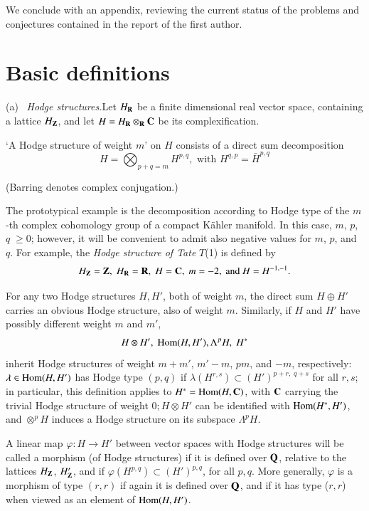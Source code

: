 We conclude with an appendix, reviewing the current status of the problems and conjectures contained in the report \cite{art4-key21} of the first author.

\section{Basic definitions}\label{art4-sec1}
(a)~ \textit{Hodge structures.}\pageoriginale Let $H_{\mathbf{R}}$ be a finite dimensional real vector space, containing a lattice $H_{\mathbf{Z}}$, and let $H=H_{\mathbf{R}} \otimes_{\mathbf{R}} \mathbf{C}$ be its complexification.

\begin{definition}\label{art4-def1.1}
`A Hodge structure of weight $m$' on $H$ consists of a direct sum decomposition
$$
H = \bigotimes_{p+q=m} H^{p,q}, \text{ with } H^{q,p} = \bar{H}^{p,q} 
$$
\end{definition}

(Barring denotes complex conjugation.)

\begin{remark*}
The prototypical example is the decomposition according to Hodge type of the $m$-th complex cohomology group of a compact K\"ahler manifold. In this case, $m$, $p$, $q \;\geqslant 0$; however, it will be convenient to admit also negative values for $m$, $p$, and $q$. For example, the \textit{Hodge structure of Tate} $T$(1) is defined by
$$
H_{\mathbf{Z}} =\mathbf{Z}, \; H_{\mathbf{R}} = \mathbf{R}, \; H = \mathbf{C}, \; m= -2, \text{ and } H = H^{-1,-1}.
$$

For any two Hodge structures $H, H'$, both of weight $m$, the direct sum $H\oplus H'$ carries an obvious Hodge structure, also of weight $m$. Similarly, if $H$ and $H'$ have possibly different weight $m$ and $m'$,
$$
H\otimes H', \; \operatorname{Hom} (H, H'), \Lambda^p H, \; H^\ast
$$
inherit Hodge structures of weight $m+ m'$, $m'-m$, $pm$, and $-m$, respectively: $\lambda \in \operatorname{Hom}(H, H')$ has Hodge type $(p,q)$ if $\lambda(H^{r,s}) \subset (H')^{p+r, \; q+s}$ for all $r, s$; in particular, this definition applies to $H^\ast = \operatorname{Hom} (H, \mathbf{C})$, with $\mathbf{C}$ carrying the trivial Hodge structure of weight $0; H \otimes H'$ can be identified with $\operatorname{Hom} (H^\ast, H')$, and $\otimes^pH$ induces a Hodge structure on its subspace $\Lambda^p H$.
 \end{remark*}

\begin{definition}\label{art4-def1.2}
A linear map $\varphi: H \to H'$ between vector spaces with Hodge structures will be called a morphism (of Hodge structures) if it is defined over $\mathbf{Q}$, relative to the lattices $H_{\mathbf{Z}}$, $H'_{\mathbf{Z}}$, and if $\varphi (H^{p,q}) \subset (H')^{p,q}$, for all $p,q$. More generally, $\varphi$ is a morphism of type $(r,r)$ if again it is defined over $\mathbf{Q}$, and if it has type ($r, r$) when viewed as an element of $\operatorname{Hom}(H, H')$.
\end{definition}

